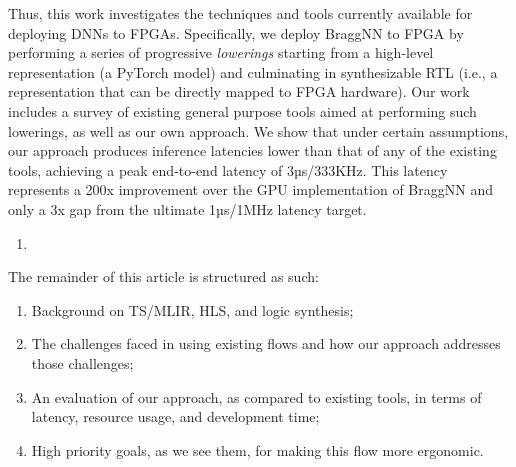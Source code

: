 Thus, this work investigates the techniques and tools currently available for deploying DNNs to FPGAs.
Specifically, we deploy BraggNN to FPGA by performing a series of progressive \emph{lowerings} starting from a high-level representation (a PyTorch model) and culminating in synthesizable RTL (i.e., a representation that can be directly mapped to FPGA hardware).
Our work includes a survey of existing general purpose tools aimed at performing such lowerings, as well as our own  approach.
We show that under certain assumptions, our approach produces inference latencies lower than that of any of the existing tools, achieving a peak end-to-end latency of 3µs/333KHz.
This latency represents a 200x improvement over the GPU implementation of BraggNN and only a 3x gap from the ultimate 1µs/1MHz latency target.


\begin{enumerate}
	\item
\end{enumerate}
The remainder of this article is structured as such:
\begin{enumerate}
	\item Background on TS/MLIR, HLS, and logic synthesis;
	\item The challenges faced in using existing flows and how our approach addresses those challenges;
	\item An evaluation of our approach, as compared to existing tools, in terms of latency, resource usage, and development time;
	\item High priority goals, as we see them, for making this flow more ergonomic.
\end{enumerate}


